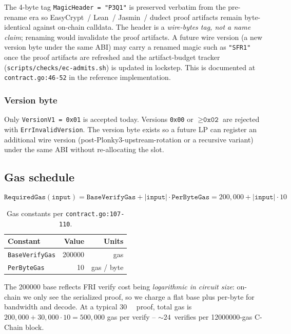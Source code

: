 The 4-byte tag \texttt{MagicHeader = "P3Q1"} is preserved verbatim
from the pre-rename era so EasyCrypt~/ Lean~/ Jasmin~/ dudect proof
artifacts remain byte-identical against on-chain calldata. The
header is a \emph{wire-bytes tag, not a name claim}; renaming would
invalidate the proof artifacts. A future wire version (a new version
byte under the same ABI) may carry a renamed magic such as
\texttt{"SFR1"} once the proof artifacts are refreshed and
the artifact-budget tracker (\texttt{scripts/checks/ec-admits.sh})
is updated in lockstep. This is documented at
\texttt{contract.go:46-52} in the reference implementation.

\subsubsection{Version byte}

Only \texttt{VersionV1 = 0x01} is accepted today. Versions
\texttt{0x00} or $\ge \texttt{0x02}$ are rejected with
\texttt{ErrInvalidVersion}. The version byte exists so a future LP
can register an additional wire version (post-Plonky3-upstream-rotation
or a recursive variant) under the same ABI without re-allocating the slot.

\subsection{Gas schedule}

\begin{equation*}
\texttt{RequiredGas}(\texttt{input}) = \texttt{BaseVerifyGas} + |\texttt{input}| \cdot \texttt{PerByteGas}
                                       = 200{,}000 + |\texttt{input}| \cdot 10
\end{equation*}

\begin{table}[h]
\centering
\small
\begin{tabular}{@{}lrr@{}}
\toprule
\textbf{Constant} & \textbf{Value} & \textbf{Units} \\
\midrule
\texttt{BaseVerifyGas} & \num{200000} & gas \\
\texttt{PerByteGas}    & \num{10}     & gas / byte \\
\bottomrule
\end{tabular}
\caption{Gas constants per \texttt{contract.go:107-110}.}
\label{tab:gas-constants}
\end{table}

The \num{200000} base reflects FRI verify cost being
\emph{logarithmic in circuit size}: on-chain we only see the
serialized proof, so we charge a flat base plus per-byte for
bandwidth and decode. At a typical \SI{30}{\kilo\byte} proof, total
gas is $200{,}000 + 30{,}000 \cdot 10 = 500{,}000$ gas per verify --
$\sim$$24$~verifies per \num{12000000}-gas C-Chain block.

